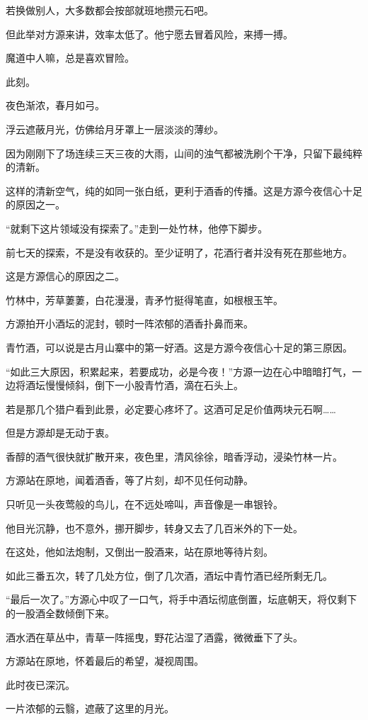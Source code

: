 \begin{this_body}
若换做别人，大多数都会按部就班地攒元石吧。

但此举对方源来讲，效率太低了。他宁愿去冒着风险，来搏一搏。

魔道中人嘛，总是喜欢冒险。

此刻。

夜色渐浓，春月如弓。

浮云遮蔽月光，仿佛给月牙罩上一层淡淡的薄纱。

因为刚刚下了场连续三天三夜的大雨，山间的浊气都被洗刷个干净，只留下最纯粹的清新。

这样的清新空气，纯的如同一张白纸，更利于酒香的传播。这是方源今夜信心十足的原因之一。

“就剩下这片领域没有探索了。”走到一处竹林，他停下脚步。

前七天的探索，不是没有收获的。至少证明了，花酒行者并没有死在那些地方。

这是方源信心的原因之二。

竹林中，芳草萋萋，白花漫漫，青矛竹挺得笔直，如根根玉竿。

方源拍开小酒坛的泥封，顿时一阵浓郁的酒香扑鼻而来。

青竹酒，可以说是古月山寨中的第一好酒。这是方源今夜信心十足的第三原因。

“如此三大原因，积累起来，若要成功，必是今夜！”方源一边在心中暗暗打气，一边将酒坛慢慢倾斜，倒下一小股青竹酒，滴在石头上。

若是那几个猎户看到此景，必定要心疼坏了。这酒可足足价值两块元石啊……

但是方源却是无动于衷。

香醇的酒气很快就扩散开来，夜色里，清风徐徐，暗香浮动，浸染竹林一片。

方源站在原地，闻着酒香，等了片刻，却不见任何动静。

只听见一头夜莺般的鸟儿，在不远处啼叫，声音像是一串银铃。

他目光沉静，也不意外，挪开脚步，转身又去了几百米外的下一处。

在这处，他如法炮制，又倒出一股酒来，站在原地等待片刻。

如此三番五次，转了几处方位，倒了几次酒，酒坛中青竹酒已经所剩无几。

“最后一次了。”方源心中叹了一口气，将手中酒坛彻底倒置，坛底朝天，将仅剩下的一股酒全数倾倒下来。

酒水洒在草丛中，青草一阵摇曳，野花沾湿了酒露，微微垂下了头。

方源站在原地，怀着最后的希望，凝视周围。

此时夜已深沉。

一片浓郁的云翳，遮蔽了这里的月光。


\end{this_body}
